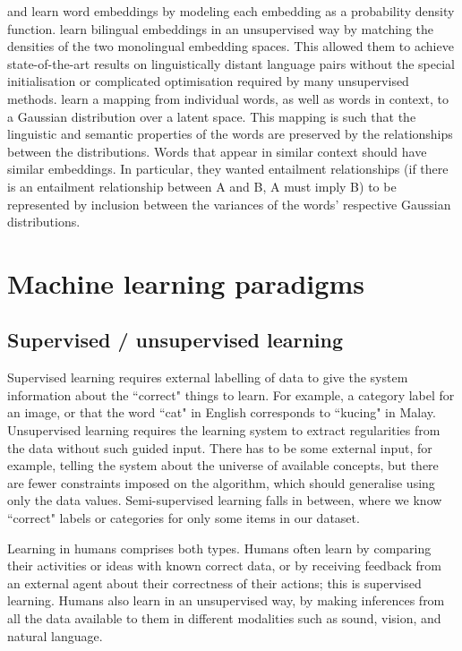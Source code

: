 \cite{DensityMatchingWordEmbeddings} and \cite{vilnis2015word} learn word embeddings by modeling each embedding as a probability density function. \cite{DensityMatchingWordEmbeddings} learn bilingual embeddings in an unsupervised way by matching the densities of the two monolingual embedding spaces. This allowed them to achieve state-of-the-art results on linguistically distant language pairs without the special initialisation or complicated optimisation required by many unsupervised methods. \cite{vilnis2015word} learn a mapping from individual words, as well as words in context, to a Gaussian distribution over a latent space. This mapping is such that the linguistic and semantic properties of the words are preserved by the relationships between the distributions. Words that appear in similar context should have similar embeddings. In particular, they wanted entailment relationships (if there is an entailment relationship between A and B, A must imply B) to be represented by inclusion between the variances of the words' respective Gaussian distributions. 

\section{Machine learning paradigms}

\subsection{Supervised / unsupervised learning}
Supervised learning requires external labelling of data to give the system information about the ``correct" things to learn. For example, a category label for an image, or that the word ``cat" in English corresponds to ``kucing" in Malay. Unsupervised learning requires the learning system to extract regularities from the data without such guided input. There has to be some external input, for example, telling the system about the universe of available concepts, but there are fewer constraints imposed on the algorithm, which should generalise using only the data values. Semi-supervised learning falls in between, where we know ``correct" labels or categories for only some items in our dataset. 

Learning in humans comprises both types. Humans often learn by comparing their activities or ideas with known correct data, or by receiving feedback from an external agent about their correctness of their actions; this is supervised learning. Humans also learn in an unsupervised way, by making inferences from all the data available to them in different modalities such as sound, vision, and natural language. 

